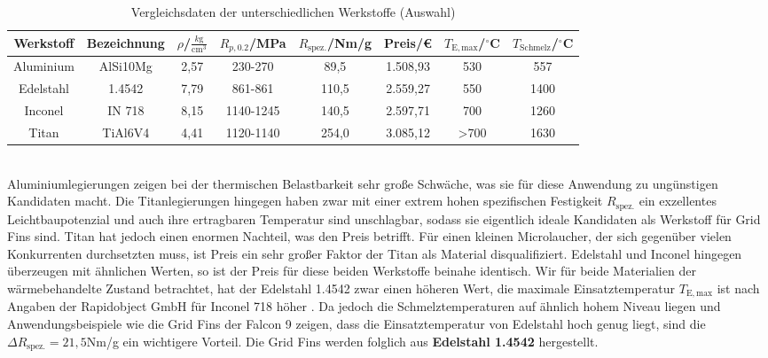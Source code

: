 \begin{table}[h] 
	\centering 
	\begin{tabular}{c|c|c|c|c|c|c|c} 
		Werkstoff&Bezeichnung&$\rho$/$\frac{k\mathrm{g}}{\mathrm{cm}^3}$&$R_{p,0.2}$/MPa&$R_\mathrm{spez.}$/Nm/g&Preis/€&$T_\mathrm{E, max}$/$^\circ$C&$T_\mathrm{Schmelz}$/$^\circ$C\\ 
		\hline 
		Aluminium&AlSi10Mg&2,57&230-270&89,5&1.508,93&530&557\\ 
		Edelstahl&1.4542&7,79&861-861&110,5&2.559,27&550&1400\\ 
		Inconel&IN 718&8,15&1140-1245&140,5&2.597,71&700&1260\\ 
		Titan&TiAl6V4&4,41&1120-1140&254,0&3.085,12&>700&1630\\ 
	\end{tabular} 
	\begin{flushright} 
	\end{flushright} 
	\caption{Vergleichsdaten der unterschiedlichen Werkstoffe (Auswahl)}
	\label{tab_WerkstoffeKlein}
\end{table} \\
Aluminiumlegierungen zeigen bei der thermischen Belastbarkeit sehr große Schwäche, was sie für diese Anwendung zu ungünstigen Kandidaten macht. Die Titanlegierungen hingegen haben zwar mit einer extrem hohen spezifischen Festigkeit $R_\mathrm{spez.}$ ein exzellentes Leichtbaupotenzial und auch ihre ertragbaren Temperatur sind unschlagbar, sodass sie eigentlich ideale Kandidaten als Werkstoff für Grid Fins sind. Titan hat jedoch einen enormen Nachteil, was den Preis betrifft. Für einen kleinen Microlaucher, der sich gegenüber vielen Konkurrenten durchsetzten muss, ist Preis ein sehr großer Faktor der Titan als Material disqualifiziert. Edelstahl und Inconel hingegen überzeugen mit ähnlichen Werten, so ist der Preis für diese beiden Werkstoffe beinahe identisch. Wir für beide Materialien der wärmebehandelte Zustand betrachtet, hat der Edelstahl 1.4542 zwar einen höheren Wert, die maximale Einsatztemperatur $T_\mathrm{E, max}$ ist nach Angaben der Rapidobject GmbH für Inconel 718 höher \cite{preise}. Da jedoch die Schmelztemperaturen auf ähnlich hohem Niveau liegen und Anwendungsbeispiele wie die Grid Fins der Falcon 9 zeigen, dass die Einsatztemperatur von Edelstahl hoch genug liegt, sind die $\Delta R_\mathrm{spez.} = 21,5$Nm/g ein wichtigere Vorteil. Die Grid Fins werden folglich aus \textbf{Edelstahl 1.4542} hergestellt.

